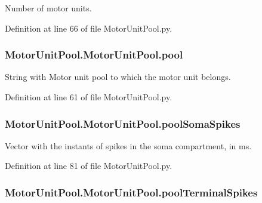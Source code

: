 Number of motor units. 



Definition at line 66 of file Motor\+Unit\+Pool.\+py.

\subsubsection[{\texorpdfstring{pool}{pool}}]{\setlength{\rightskip}{0pt plus 5cm}Motor\+Unit\+Pool.\+Motor\+Unit\+Pool.\+pool}\hypertarget{class_motor_unit_pool_1_1_motor_unit_pool_a832364dc014aa8a1b2947abfe063f626}{}\label{class_motor_unit_pool_1_1_motor_unit_pool_a832364dc014aa8a1b2947abfe063f626}


String with Motor unit pool to which the motor unit belongs. 



Definition at line 61 of file Motor\+Unit\+Pool.\+py.

\subsubsection[{\texorpdfstring{pool\+Soma\+Spikes}{poolSomaSpikes}}]{\setlength{\rightskip}{0pt plus 5cm}Motor\+Unit\+Pool.\+Motor\+Unit\+Pool.\+pool\+Soma\+Spikes}\hypertarget{class_motor_unit_pool_1_1_motor_unit_pool_a3790757a111061662ad0f98120b25e69}{}\label{class_motor_unit_pool_1_1_motor_unit_pool_a3790757a111061662ad0f98120b25e69}


Vector with the instants of spikes in the soma compartment, in ms. 



Definition at line 81 of file Motor\+Unit\+Pool.\+py.

\subsubsection[{\texorpdfstring{pool\+Terminal\+Spikes}{poolTerminalSpikes}}]{\setlength{\rightskip}{0pt plus 5cm}Motor\+Unit\+Pool.\+Motor\+Unit\+Pool.\+pool\+Terminal\+Spikes}\hypertarget{class_motor_unit_pool_1_1_motor_unit_pool_a4f0b93df27eb6303fa1a3d49653d4fd3}{}\label{class_motor_unit_pool_1_1_motor_unit_pool_a4f0b93df27eb6303fa1a3d49653d4fd3}


